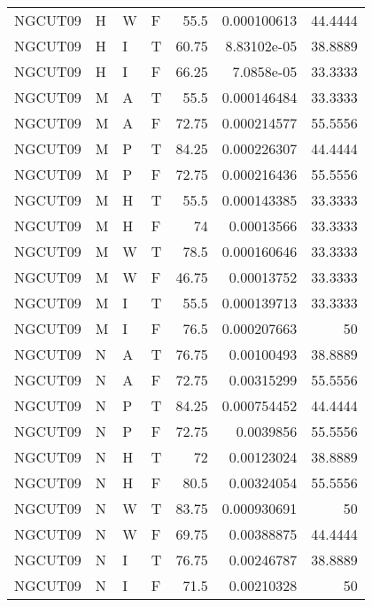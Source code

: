 \begin{table}[!htb]
{\begin{tabular}{llllrrr}
            NGCUT09  & H     & W     & F          & 55.5       & 0.000100613 & 44.4444  \\
            NGCUT09  & H     & I     & T          & 60.75      & 8.83102e-05 & 38.8889  \\
            NGCUT09  & H     & I     & F          & 66.25      & 7.0858e-05  & 33.3333  \\
            NGCUT09  & M     & A     & T          & 55.5       & 0.000146484 & 33.3333  \\
            NGCUT09  & M     & A     & F          & 72.75      & 0.000214577 & 55.5556  \\
            NGCUT09  & M     & P     & T          & 84.25      & 0.000226307 & 44.4444  \\
            NGCUT09  & M     & P     & F          & 72.75      & 0.000216436 & 55.5556  \\
            NGCUT09  & M     & H     & T          & 55.5       & 0.000143385 & 33.3333  \\
            NGCUT09  & M     & H     & F          & 74         & 0.00013566  & 33.3333  \\
            NGCUT09  & M     & W     & T          & 78.5       & 0.000160646 & 33.3333  \\
            NGCUT09  & M     & W     & F          & 46.75      & 0.00013752  & 33.3333  \\
            NGCUT09  & M     & I     & T          & 55.5       & 0.000139713 & 33.3333  \\
            NGCUT09  & M     & I     & F          & 76.5       & 0.000207663 & 50       \\
            NGCUT09  & N     & A     & T          & 76.75      & 0.00100493  & 38.8889  \\
            NGCUT09  & N     & A     & F          & 72.75      & 0.00315299  & 55.5556  \\
            NGCUT09  & N     & P     & T          & 84.25      & 0.000754452 & 44.4444  \\
            NGCUT09  & N     & P     & F          & 72.75      & 0.0039856   & 55.5556  \\
            NGCUT09  & N     & H     & T          & 72         & 0.00123024  & 38.8889  \\
            NGCUT09  & N     & H     & F          & 80.5       & 0.00324054  & 55.5556  \\
            NGCUT09  & N     & W     & T          & 83.75      & 0.000930691 & 50       \\
            NGCUT09  & N     & W     & F          & 69.75      & 0.00388875  & 44.4444  \\
            NGCUT09  & N     & I     & T          & 76.75      & 0.00246787  & 38.8889  \\
            NGCUT09  & N     & I     & F          & 71.5       & 0.00210328  & 50       \\
            \hline
        \end{tabular}
    }{}
\end{table}